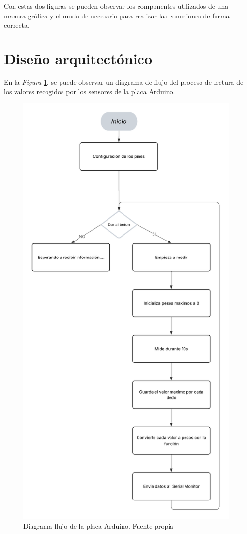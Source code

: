Con estas dos figuras se pueden observar los componentes utilizados de una manera gráfica y el modo de necesario para realizar las conexiones de forma correcta.


\section{Diseño arquitectónico}

En la \textit{Figura} \ref{fig:Diagrama_flujo_arduino}, se puede observar un diagrama de flujo del proceso de lectura de los valores recogidos por los sensores de la placa Arduino. 

\begin{figure}
    \centering
    \includegraphics[width=0.8\linewidth]{img/Diagrama_flujo_arduino.png}
    \caption{Diagrama flujo de la placa Arduino. Fuente propia}
    \label{fig:Diagrama_flujo_arduino}
\end{figure}

